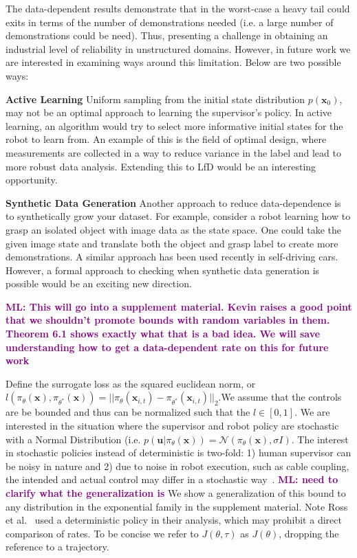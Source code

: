\documentclass[10pt, conference]{ieeeconf}      %
\newcommand{\bu}{\mathbf{u}}
\newcommand{\bx}{\mathbf{x}}
\newcommand{\mlnote}[1]{\ifthenelse{ \boolean{include-notes}}%
 {\textcolor{purple}{\textbf{ML: #1}}}{}}
\begin{document}
The data-dependent results demonstrate that in the worst-case a heavy tail could exits in terms of the number of demonstrations needed (i.e. a large number of demonstrations could be need). Thus, presenting a challenge in obtaining an industrial level of reliability in unstructured domains. However, in future work we are interested in examining ways around this limitation. Below are two possible ways:

\noindent \textbf{Active Learning} Uniform sampling from the initial state distribution $p(\bx_0)$, may not be an optimal approach to learning the supervisor's policy. In active learning, an algorithm would try to select more informative initial states for the robot to learn from. An example of this is the field of optimal design, where measurements are collected in a way to reduce variance in the label and lead to more robust data analysis. Extending this to LfD would be an interesting opportunity. 

\noindent \textbf{Synthetic Data Generation} Another approach to reduce data-dependence is to synthetically grow your dataset. For example, consider a robot learning how to grasp an isolated object  with image data as the state space. One could take the given image state and translate both the object and grasp label to create more demonstrations. A similar approach has been used recently in self-driving cars. However, a formal approach to checking when synthetic data generation is possible would be an exciting new direction. 





\appendix
\mlnote{This will go into a supplement material. Kevin raises a good point that we shouldn't promote bounds with random variables in them. Theorem 6.1 shows exactly what that is a bad idea. We will save understanding how to get a data-dependent rate on this for future work}

 Define the surrogate loss as the squared euclidean norm, or $l(\pi_{\theta}(\bx),\pi_{\theta^*}(\bx)) = ||\pi_{\theta}(\bx_{i,t}) - \pi_{\theta^*}(\bx_{i,t})||_2$.We assume that the controls are be bounded and thus can be normalized such that the $l \in [0,1]$.  We are interested in the situation where the supervisor and robot policy are stochastic with a Normal Distribution (i.e. $p(\bu|\pi_{\theta}(\bx)) = \mathcal{N}(\pi_\theta(\bx),\sigma I)$. The interest in stochastic policies instead of deterministic is two-fold: 1) human supervisor can be noisy in nature and 2) due to noise in robot execution, such as cable coupling, the intended and actual control may differ in a stochastic way~\cite{mahler2014learning}. \mlnote{need to clarify what the generalization is} We show a generalization of this bound to any distribution in the exponential family in the supplement material.  Note Ross et al.~\cite{ross2010reduction} used a deterministic policy in their analysis, which may prohibit a direct comparison of rates. To be concise we refer to $J(\theta, \tau)$ as $J(\theta)$, dropping the reference to a trajectory.
\end{document}
